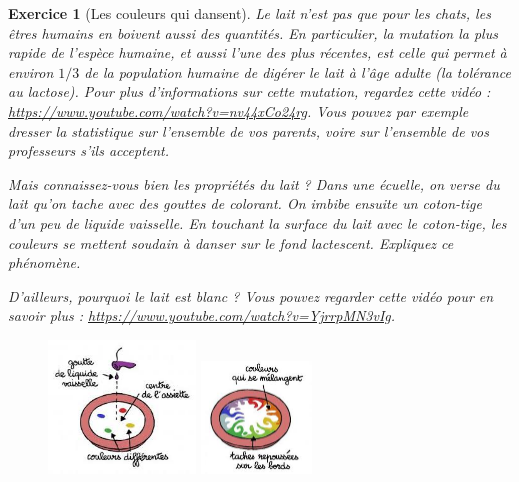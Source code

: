 \documentclass[12pt]{article}
\theoremstyle{break}
\newtheorem{exo}{Exercice}
\begin{document}
\begin{exo}[Les couleurs qui dansent]
Le lait n'est pas que pour les chats, les êtres humains en boivent aussi des quantités. En particulier, la mutation la plus rapide de l'espèce humaine, et aussi l'une des plus récentes, est celle qui permet à environ $1/3$ de la population humaine de digérer le lait à l'âge adulte (la tolérance au lactose). Pour plus d'informations sur cette mutation, regardez cette vidéo : \url{https://www.youtube.com/watch?v=nv44xCo24rg}. Vous pouvez par exemple dresser la statistique sur l'ensemble de vos parents, voire sur l'ensemble de vos professeurs s'ils acceptent.

Mais connaissez-vous bien les propriétés du lait ? Dans une écuelle, on verse du lait qu'on tache avec des gouttes de colorant. On imbibe ensuite un coton-tige d'un peu de liquide vaisselle. En touchant la surface du lait avec le coton-tige, les couleurs se mettent soudain à danser sur le fond lactescent. Expliquez ce phénomène.

D'ailleurs, pourquoi le lait est blanc ? Vous pouvez regarder cette vidéo pour en savoir plus : \url{https://www.youtube.com/watch?v=YjrrpMN3vIg}.

\begin{figure}[h!]
	\centering
    \includegraphics[width=0.35\textwidth]{images/LaitColorants.jpg}
    \includegraphics[width=0.26\textwidth]{images/LaitColorants2.jpg}
\end{figure}


\end{exo}
\end{document}
